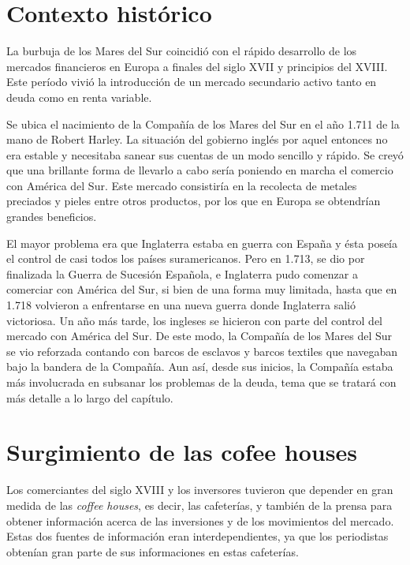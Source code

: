 \section{Contexto histórico}

La burbuja de los Mares del Sur coincidió con el rápido desarrollo de los mercados financieros en Europa a finales del siglo XVII y principios del XVIII. Este período vivió la introducción de un mercado secundario activo tanto en deuda como en renta variable. 

Se ubica el nacimiento de la Compañía de los Mares del Sur en el año 1.711 de la mano de Robert Harley. La situación del gobierno inglés por aquel entonces no era estable y necesitaba sanear sus cuentas de un modo sencillo y rápido. Se creyó que una brillante forma de llevarlo a cabo sería poniendo en marcha el comercio con América del Sur. Este mercado consistiría en la recolecta de metales preciados y pieles entre otros productos, por los que en Europa se obtendrían grandes beneficios.

El mayor problema era que Inglaterra estaba en guerra con España y ésta poseía el control de casi todos los países suramericanos. Pero en 1.713, se dio por finalizada la Guerra de Sucesión Española, e Inglaterra pudo comenzar a comerciar con América del Sur, si bien de una forma muy limitada, hasta que en 1.718 volvieron a enfrentarse en una nueva guerra donde Inglaterra salió victoriosa. Un año más tarde, los ingleses se hicieron con parte del control del mercado con América del Sur. De este modo, la Compañía de los Mares del Sur se vio reforzada contando con barcos de esclavos y barcos textiles que navegaban bajo la bandera de la Compañía. Aun así, desde sus inicios, la Compañía estaba más involucrada en subsanar los problemas de la deuda, tema que se tratará con más detalle a lo largo del capítulo. 

\section{Surgimiento de las cofee houses}

Los comerciantes del siglo XVIII y los inversores tuvieron que depender en gran medida de las \emph{coffee houses}, es decir, las cafeterías, y también de la prensa para obtener información acerca de las inversiones y de los movimientos del mercado. Estas dos fuentes de información eran interdependientes, ya que los periodistas obtenían gran parte de sus informaciones en estas cafeterías.

